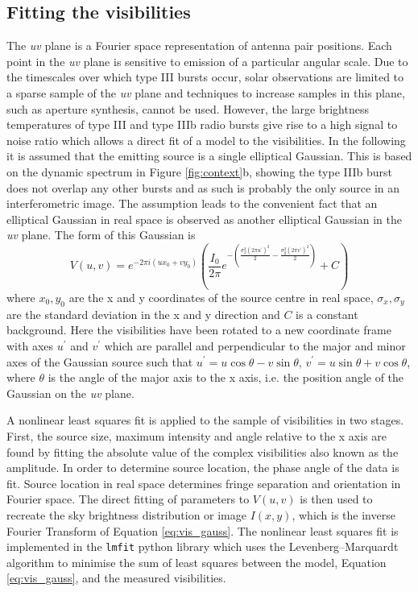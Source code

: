 \subsection{Fitting the visibilities}
\label{sec:vis_fit}
The \textit{uv} plane is a Fourier space representation of antenna pair positions. Each point in the \textit{uv} plane is sensitive to emission of a particular angular scale. Due to the timescales over which type III bursts occur, solar observations are limited to a sparse sample of the \textit{uv} plane and techniques to increase samples in this plane, such as aperture synthesis, cannot be used. However, the large brightness temperatures of type III and type IIIb radio bursts \citep{Reid2014} give rise to a  high signal to noise ratio which allows a direct fit of a model to the visibilities.
In the following it is assumed that the emitting source is a single elliptical Gaussian. This is based on the dynamic spectrum in Figure \ref{fig:context}b, showing the type IIIb burst does not overlap any other bursts and as such is probably the only source in an interferometric image. The assumption leads to the convenient fact that an elliptical Gaussian in real space is observed as another elliptical Gaussian in the \textit{uv} plane. The form of this Gaussian is
\begin{equation}
V(u,v) = e^{-2\pi i(ux_0+vy_0)} \left( \frac{I_0}{2\pi} e^{-\left(\frac{\sigma_x^2(2\pi u^\prime)^2}{2}-\frac{\sigma_y^2(2\pi v^\prime)^2}{2}\right)} + C \right)
\label{eq:vis_gauss}
\end{equation}
where $x_0, y_0$ are the x and y coordinates of the source centre in real space, $\sigma_x, \sigma_y$ are the standard deviation in the x and y direction and $C$ is a constant background. Here the visibilities have been rotated to a new coordinate frame with axes $u^\prime$ and $v^\prime$ which are parallel and perpendicular to the major and minor axes of the Gaussian source such that $u^\prime = u\cos{\theta} - v\sin{\theta} \mbox{, } v^\prime = u\sin{\theta} + v\cos{\theta}$,  where $\theta$ is the angle of the major axis to the x axis, i.e. the position angle of the Gaussian on the \textit{uv} plane.

A nonlinear least squares fit is applied to the sample of visibilities in two stages. First, the source size, maximum intensity and angle relative to the x axis are found by fitting the absolute value of the complex visibilities also known as the amplitude.
In order to determine source location, the phase angle of the data is fit. Source location in real space determines fringe separation and orientation in Fourier space. The direct fitting of parameters to \textbf{$V(u,v)$} is then used to recreate the sky brightness distribution or image \textbf{$I(x,y)$}, which is the inverse Fourier Transform of Equation \ref{eq:vis_gauss}. The nonlinear least squares fit is implemented in the \texttt{lmfit} python library \citep{Newville2014} which uses the Levenberg–Marquardt algorithm to minimise the sum of least squares between the model, Equation \ref{eq:vis_gauss}, and the measured visibilities.


